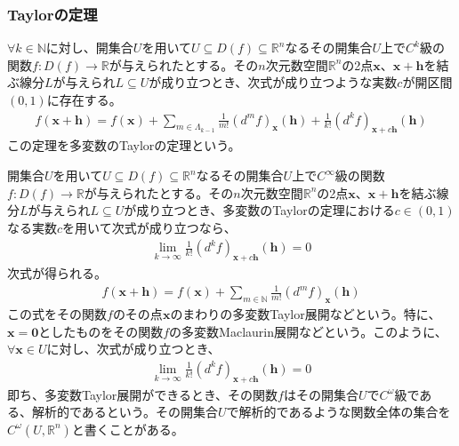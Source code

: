 \documentclass[dvipdfmx]{jsarticle}
\begin{document}
\subsubsection{Taylorの定理}%
\begin{thm}[多変数のTaylorの定理]\label{4.2.7.2}
$\forall k \in \mathbb{N}$に対し、開集合$U$を用いて$U \subseteq D(f) \subseteq \mathbb{R}^{n}$なるその開集合$U$上で$C^{k}$級の関数$f:D(f) \rightarrow \mathbb{R}$が与えられたとする。その$n$次元数空間$\mathbb{R}^{n}$の2点$\mathbf{x}$、$\mathbf{x} + \mathbf{h}$を結ぶ線分$L$が与えられ$L \subseteq U$が成り立つとき、次式が成り立つような実数$c$が開区間$(0,1)$に存在する。
\begin{align*}
f\left( \mathbf{x} + \mathbf{h} \right) = f\left( \mathbf{x} \right) + \sum_{m \in \varLambda_{k - 1}} {\frac{1}{m!}\left( d^{m}f \right)_{\mathbf{x}}\left( \mathbf{h} \right)} + \frac{1}{k!}\left( d^{k}f \right)_{\mathbf{x} + c\mathbf{h}}\left( \mathbf{h} \right)
\end{align*}
この定理を多変数のTaylorの定理という。
\end{thm}
\begin{dfn}
開集合$U$を用いて$U \subseteq D(f) \subseteq \mathbb{R}^{n}$なるその開集合$U$上で$C^{\infty}$級の関数$f:D(f) \rightarrow \mathbb{R}$が与えられたとする。その$n$次元数空間$\mathbb{R}^{n}$の2点$\mathbf{x}$、$\mathbf{x} + \mathbf{h}$を結ぶ線分$L$が与えられ$L \subseteq U$が成り立つとき、多変数のTaylorの定理における$c \in (0,1)$なる実数$c$を用いて次式が成り立つなら、
\begin{align*}
\lim_{k \rightarrow \infty}{\frac{1}{k!}\left( d^{k}f \right)_{\mathbf{x} + c\mathbf{h}}\left( \mathbf{h} \right)} = 0
\end{align*}
次式が得られる。
\begin{align*}
f\left( \mathbf{x} + \mathbf{h} \right) = f\left( \mathbf{x} \right) + \sum_{m \in \mathbb{N}} {\frac{1}{m!}\left( d^{m}f \right)_{\mathbf{x}}\left( \mathbf{h} \right)}
\end{align*}
この式をその関数$f$のその点$\mathbf{x}$のまわりの多変数Taylor展開などという。特に、$\mathbf{x} = \mathbf{0}$としたものをその関数$f$の多変数Maclaurin展開などという。このように、$\forall\mathbf{x} \in U$に対し、次式が成り立つとき、
\begin{align*}
\lim_{k \rightarrow \infty}{\frac{1}{k!}\left( d^{k}f \right)_{\mathbf{x} + c\mathbf{h}}\left( \mathbf{h} \right)} = 0
\end{align*}
即ち、多変数Taylor展開ができるとき、その関数$f$はその開集合$U$で$C^{\omega}$級である、解析的であるという。その開集合$U$で解析的であるような関数全体の集合を$C^{\omega}\left( U,\mathbb{R}^{n} \right)$と書くことがある。
\end{dfn}
\end{document}
